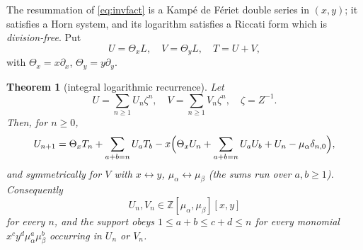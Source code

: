 \documentclass[12pt]{amsart}
\newtheorem{theorem}{Theorem}[section]
\theoremstyle{definition}
\theoremstyle{remark}
\newcommand{\ma}{\mu_\alpha}
\newcommand{\mb}{\mu_\beta}
\begin{document}
The resummation of \eqref{eq:invfact} is a Kamp\'e de F\'eriet double series in $(x,y)$; it satisfies a Horn system, and its logarithm satisfies a Riccati form which is \emph{division-free}.  Put 
\[
U=\Theta_xL, \quad V=\Theta_yL, \quad T=U+V,
\]
with $\Theta_x=x\partial_x$, $\Theta_y=y\partial_y$.

\begin{theorem}[integral logarithmic recurrence]\label{thm:hornrec}
Let
\[
U=\sum_{n\ge1}U_n\zeta^n, \quad V=\sum_{n\ge1}V_n\zeta^n, \quad \zeta=Z^{-1}.
\]
Then, for $n\ge0$,
\begin{equation}\label{eq:hornrecc}
  U_{n+1}=\Theta_xT_n+\sum_{a+b=n}U_aT_b -x\Bigl(\Theta_xU_n+\sum_{a+b=n}U_aU_b+U_n-\ma\delta_{n,0}\Bigr),
\end{equation}
and symmetrically for $V$ with $x\leftrightarrow y$, $\ma\leftrightarrow\mb$
(the sums run over $a,b\ge1$).  Consequently
\[
U_n,V_n\in\mathbb Z[\ma,\mb][x,y]
\]
for every $n$, and the support obeys $1\le a+b\le c+d\le n$ for every monomial $x^cy^d\ma^a\mb^b$ occurring in $U_n$ or $V_n$.
\end{theorem}
\end{document}
